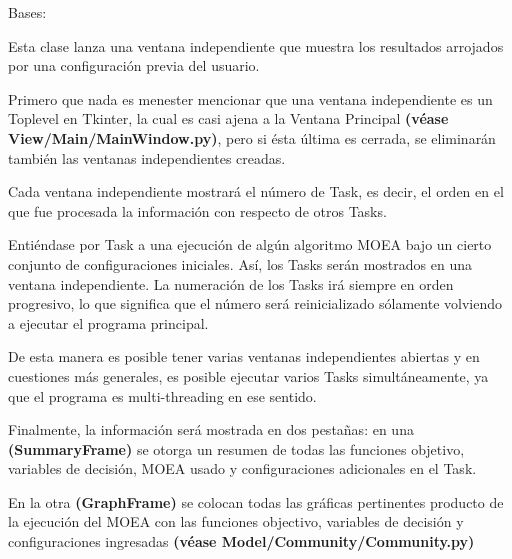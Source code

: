 \documentclass[letterpaper,10pt,english]{sphinxmanual}
\begin{document}
\begin{fulllineitems}
\label{View/Additional/ResultsGrapher/ResultsGrapherToplevel:View.Additional.ResultsGrapher.ResultsGrapherToplevel.ResultsGrapherToplevel}
Bases: 

\begin{DUlineblock}{0em}
\item[] Esta clase lanza una ventana independiente que muestra los resultados arrojados por una configuración
previa del usuario.
\item[] 
\item[] Primero que nada es menester mencionar que una ventana independiente es un Toplevel en Tkinter,
la cual es casi ajena a la Ventana Principal \textbf{(véase View/Main/MainWindow.py)}, pero si ésta última es
cerrada, se eliminarán también las ventanas independientes creadas.
\item[] 
\item[] Cada ventana independiente mostrará el número de Task, es decir, el orden en el que fue procesada la información
con respecto de otros Tasks.
\item[] 
\item[] Entiéndase por Task a una ejecución de algún algoritmo MOEA bajo un cierto conjunto de configuraciones iniciales.
Así, los Tasks serán mostrados en una ventana independiente. La numeración de los Tasks irá siempre en orden progresivo,
lo que significa que el número será reinicializado sólamente volviendo a ejecutar el programa principal.
\item[] De esta manera es posible tener varias ventanas independientes abiertas y en cuestiones más generales, es posible
ejecutar varios Tasks simultáneamente, ya que el programa es multi-threading en ese sentido.
\item[] 
\item[] Finalmente, la información será mostrada en dos pestañas: en una \textbf{(SummaryFrame)} se otorga un resumen de todas
las funciones objetivo, variables de decisión, MOEA usado y configuraciones adicionales en el Task.
\item[] En la otra \textbf{(GraphFrame)} se colocan todas las gráficas pertinentes producto de la ejecución del MOEA con las
funciones objectivo, variables de decisión y configuraciones ingresadas \textbf{(véase Model/Community/Community.py)}

\end{DUlineblock}
\end{fulllineitems}
\end{document}
